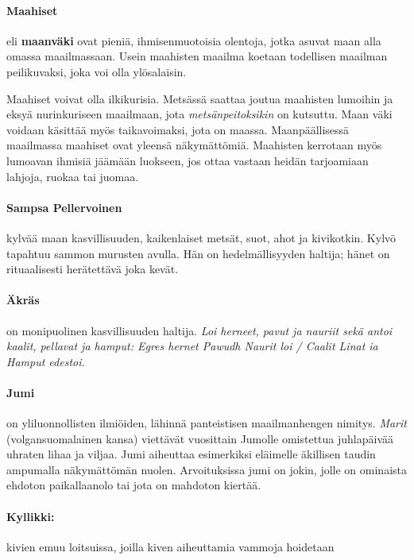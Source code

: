   \paragraph{Maahiset} eli \textbf{maanväki} ovat pieniä, ihmisenmuotoisia olentoja, jotka asuvat
    maan alla omassa maailmassaan. Usein maahisten maailma koetaan todellisen maailman
    peilikuvaksi, joka voi olla ylösalaisin.
    \par
    Maahiset voivat olla ilkikurisia. Metsässä saattaa joutua maahisten lumoihin ja eksyä
    nurinkuriseen maailmaan, jota \emph{metsänpeitoksikin} on kutsuttu. Maan väki voidaan käsittää
    myös taikavoimaksi, jota on maassa. Maanpäällisessä maailmassa maahiset ovat yleensä
    näkymättömiä. Maahisten kerrotaan myös lumoavan ihmisiä jäämään luokseen, jos ottaa vastaan
    heidän tarjoamiaan lahjoja, ruokaa tai juomaa.
  \paragraph{Sampsa Pellervoinen} kylvää maan kasvillisuuden, kaikenlaiset metsät, suot, ahot ja
    kivikotkin. Kylvö tapahtuu sammon murusten avulla. Hän on hedelmällisyyden haltija; hänet on
    rituaalisesti herätettävä joka kevät.
  \paragraph{Äkräs} on monipuolinen kasvillisuuden haltija. \emph{Loi herneet, pavut ja nauriit
    sekä antoi kaalit, pellavat ja hamput: Egres hernet Pawudh Naurit loi / Caalit Linat ia Hamput
    edestoi.}
  \paragraph{Jumi} on yliluonnollisten ilmiöiden, lähinnä panteistisen maailmanhengen nimitys.
    \emph{Marit} (volgansuomalainen kansa) viettävät vuosittain Jumolle omistettua juhlapäivää
    uhraten lihaa ja viljaa. Jumi aiheuttaa esimerkiksi eläimelle äkillisen taudin ampumalla
    näkymättömän nuolen. Arvoituksissa jumi on jokin, jolle on ominaista ehdoton paikallaanolo
    tai jota on mahdoton kiertää.

    \paragraph{Kyllikki:} kivien emuu loitsuissa, joilla kiven aiheuttamia vammoja hoidetaan
